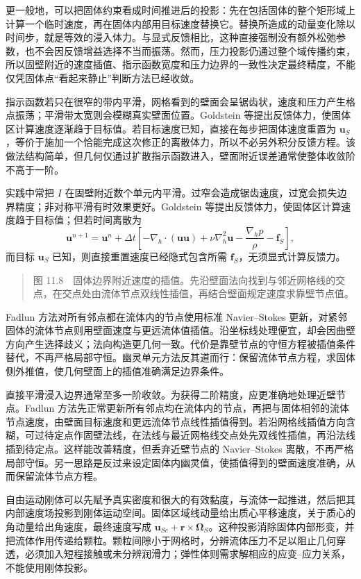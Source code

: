 \documentclass[11pt,a4paper,openany,fontset=none]{ctexbook}
\begin{document}
更一般地，可以把固体约束看成时间推进后的投影：先在包括固体的整个矩形域上计算一个临时速度，再在固体内部用目标速度替换它。替换所造成的动量变化除以时间步，就是等效的浸入体力。与显式反馈相比，这种直接强制没有额外松弛参数，也不会因反馈增益选择不当而振荡。然而，压力投影仍通过整个域传播约束，所以固壁附近的速度插值、指示函数宽度和压力边界的一致性决定最终精度，不能仅凭固体点“看起来静止”判断方法已经收敛。

指示函数若只在很窄的带内平滑，网格看到的壁面会呈锯齿状，速度和压力产生格点振荡；平滑带太宽则会模糊真实壁面位置。Goldstein 等提出反馈体力，使固体区计算速度逐渐趋于目标值。若目标速度已知，直接在每步把固体速度重置为 $\bm u_S$，等价于施加一个恰能完成这次修正的离散体力，所以不必另外积分反馈方程。该做法结构简单，但几何仅通过扩散指示函数进入，壁面附近误差通常使整体收敛阶不高于一阶。

实践中常把 $I$ 在固壁附近数个单元内平滑。过窄会造成锯齿速度，过宽会损失边界精度；非对称平滑有时效果更好。Goldstein 等提出反馈体力，使固体区计算速度趋于目标值；但若时间离散为
\begin{equation}
 \bm u^{n+1}=\bm u^n+\Delta t\left[-\nabla_h\cdot(\bm u\bm u)+\nu\nabla_h^2\bm u-\frac{\nabla_hp}{\rho}-\bm f_S\right], \tag{11.16}
\end{equation}
而目标 $\bm u_S$ 已知，则直接重置速度已经隐式包含所需 $\bm f_S$，无须显式计算反馈力。

\begin{quote}\small 图 11.8　固体边界附近速度的插值。先沿壁面法向找到与邻近网格线的交点，在交点处由流体节点双线性插值，再结合壁面规定速度求靠壁节点值。\end{quote}
Fadlun 方法对所有邻点都在流体内的节点使用标准 Navier--Stokes 更新，对紧邻固体的流体节点则用壁面速度与更远流体值插值。沿坐标线处理便宜，却会因曲壁方向产生选择歧义；法向构造更几何一致。代价是靠壁节点的守恒方程被插值条件替代，不再严格局部守恒。幽灵单元方法反其道而行：保留流体节点方程，求固体侧外推值，使几何壁面上的插值准确满足边界条件。

直接平滑浸入边界通常至多一阶收敛。为获得二阶精度，应更准确地处理近壁节点。Fadlun 方法先正常更新所有邻点均在流体内的节点，再把与固体相邻的流体节点速度，由壁面目标速度和更远流体节点线性插值得到。若沿网格线插值方向含糊，可过待定点作固壁法线，在法线与最近网格线交点处先双线性插值，再沿法线插到待定点。这样能改善精度，但丢弃近壁节点的 Navier--Stokes 离散，不再严格局部守恒。另一思路是反过来设定固体内幽灵值，使插值得到的壁面速度准确，从而保留流体节点方程。

自由运动刚体可以先赋予真实密度和很大的有效黏度，与流体一起推进，然后把其内部速度场投影到刚体运动空间。固体区域线动量给出质心平移速度，关于质心的角动量给出角速度，最终速度写成 $\bm u_{Sc}+\bm r\times\bm\Omega_S$。这种投影消除固体内部形变，并把流体作用传递给颗粒。颗粒间隙小于网格时，分辨流体压力不足以阻止几何穿透，必须加入短程接触或未分辨润滑力；弹性体则需求解相应的应变--应力关系，不能使用刚体投影。
\end{document}
